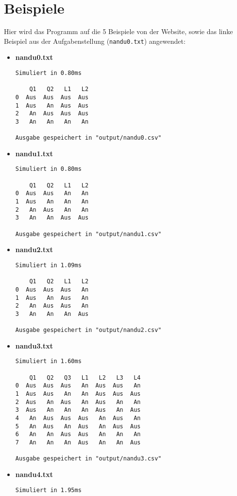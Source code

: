 \documentclass[a4paper,12pt]{scrartcl}
\theoremstyle{definition}
\begin{document}
\section{Beispiele}

Hier wird das Programm auf die 5 Beispiele von der Website, sowie das linke
Beispiel aus der Aufgabenstellung (\texttt{nandu0.txt}) angewendet:

\begin{itemize}
	\item \textbf{nandu0.txt}\begin{verbatim}
Simuliert in 0.80ms

    Q1   Q2   L1   L2
0  Aus  Aus  Aus  Aus
1  Aus   An  Aus  Aus
2   An  Aus  Aus  Aus
3   An   An   An   An

Ausgabe gespeichert in "output/nandu0.csv"
	\end{verbatim}
	\item \textbf{nandu1.txt}\begin{verbatim}
Simuliert in 0.80ms

    Q1   Q2   L1   L2
0  Aus  Aus   An   An
1  Aus   An   An   An
2   An  Aus   An   An
3   An   An  Aus  Aus

Ausgabe gespeichert in "output/nandu1.csv"
	\end{verbatim}
	\item \textbf{nandu2.txt}\begin{verbatim}
Simuliert in 1.09ms

    Q1   Q2   L1   L2
0  Aus  Aus  Aus   An
1  Aus   An  Aus   An
2   An  Aus  Aus   An
3   An   An   An  Aus

Ausgabe gespeichert in "output/nandu2.csv"
	\end{verbatim}
	\item \textbf{nandu3.txt}\begin{verbatim}
Simuliert in 1.60ms

    Q1   Q2   Q3   L1   L2   L3   L4
0  Aus  Aus  Aus   An  Aus  Aus   An
1  Aus  Aus   An   An  Aus  Aus  Aus
2  Aus   An  Aus   An  Aus   An   An
3  Aus   An   An   An  Aus   An  Aus
4   An  Aus  Aus  Aus   An  Aus   An
5   An  Aus   An  Aus   An  Aus  Aus
6   An   An  Aus  Aus   An   An   An
7   An   An   An  Aus   An   An  Aus

Ausgabe gespeichert in "output/nandu3.csv"
	\end{verbatim}
	\item \textbf{nandu4.txt}\begin{verbatim}
Simuliert in 1.95ms


\end{verbatim}
\end{itemize}
\end{document}
